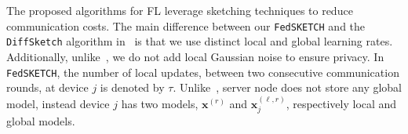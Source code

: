 \documentclass[twoside]{article}
\begin{document}
The proposed algorithms for FL leverage sketching techniques to reduce communication costs.
The main difference between our \texttt{FedSKETCH} and the \texttt{DiffSketch} algorithm in~\cite{li2019privacy} is that we use distinct local and global learning rates. Additionally, unlike~\cite{li2019privacy}, we do not add local Gaussian noise to ensure privacy. 
In \texttt{FedSKETCH}, the number of local updates, between two consecutive communication rounds, at device $j$ is denoted by $\tau$.
 Unlike~\cite{haddadpour2020federated}, server node does not store any global model, instead device $j$ has two models, $\boldsymbol{x}^{(r)}$ and $\boldsymbol{x}^{(\ell,r)}_j$, respectively local and global models. 
%
\end{document}
